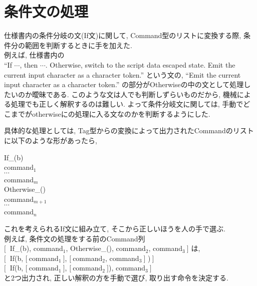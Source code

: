 \documentclass[uplatex,a4j]{jsreport}
\begin{document}
\section{条件文の処理}
仕様書内の条件分岐の文(If文)に関して, Command型のリストに変換する際, 条件分の範囲を判断するときに手を加えた.\\
例えば, 仕様書内の\\
``If $\cdots$, then $\cdots$. Otherwise, switch to the script data escaped state. Emit the current input character as a character token.''
という文の, ``Emit the current input character as a character token.'' の部分がOtherwiseの中の文として処理したいのか曖昧である. 
このような文は人でも判断しずらいものだから, 機械による処理でも正しく解釈するのは難しい.
よって条件分岐文に関しては, 手動でどこまでがotherwiseにの処理に入る文なのかを判断するようにした. 

具体的な処理としては, 
Tag型からの変換によって出力されたCommandのリストに以下のような形があったら, 
\begin{screen}
      If_(b)\\
      command$_1$\\
      $\cdots$\\
      command$_m$\\
      Otherwise_()\\
      command$_{m+1}$\\
      $\cdots$\\
      command$_n$
\end{screen}
これを考えられるIf文に組み立て, そこから正しいほうを人の手で選ぶ. \\

例えば, 
条件文の処理をする前のCommand列\\
$[\ $ If_(b), command$_1$, Otherwise_(), command$_2$, command$_3 \ ]$
は, \\
$[\ $ If(b, $[\ $command$_1 \ ]$, $[\ $command$_2$, command$_3 \ ]$ )$\ ]$\\
$[\ $ If(b, $[\ $command$_1 \ ]$, $[\ $command$_2 \ ]$), command$_3 \ ]$ \\
と2つ出力され, 正しい解釈の方を手動で選び, 取り出す命令を決定する.
\end{document}

